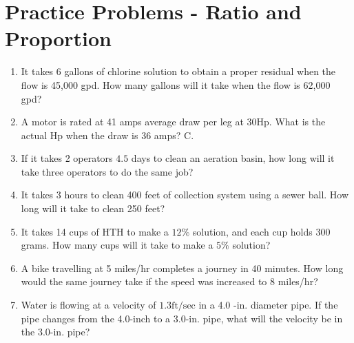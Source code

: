 \section*{Practice Problems - Ratio and Proportion}
\begin{enumerate}
\item It takes 6 gallons of chlorine solution to obtain a proper residual when the flow is 45,000 gpd. How many gallons will it take when the flow is 62,000 gpd?

\item A motor is rated at 41 amps average draw per leg at $30 \mathrm{Hp}$. What is the actual $\mathrm{Hp}$ when the draw is 36 amps? C. 

\item If it takes 2 operators $4.5$ days to clean an aeration basin, how long will it take three operators to do the same job?

\item It takes 3 hours to clean 400 feet of collection system using a sewer ball. How long will it take to clean 250 feet?

\item It takes 14 cups of $\mathrm{HTH}$ to make a $12 \%$ solution, and each cup holds 300 grams. How many cups will it take to make a $5 \%$ solution?

\item A bike travelling at 5 miles/hr completes a journey in 40 minutes. How long would the same journey take if the speed was increased to 8 miles/hr?

\item Water is flowing at a velocity of $1.3 \mathrm{ft} / \mathrm{sec}$ in a 4.0 -in. diameter pipe. If the pipe changes from the 4.0-inch to a 3.0-in. pipe, what will the velocity be in the 3.0-in. pipe?\\

\end{enumerate}
\vspace{1cm}


